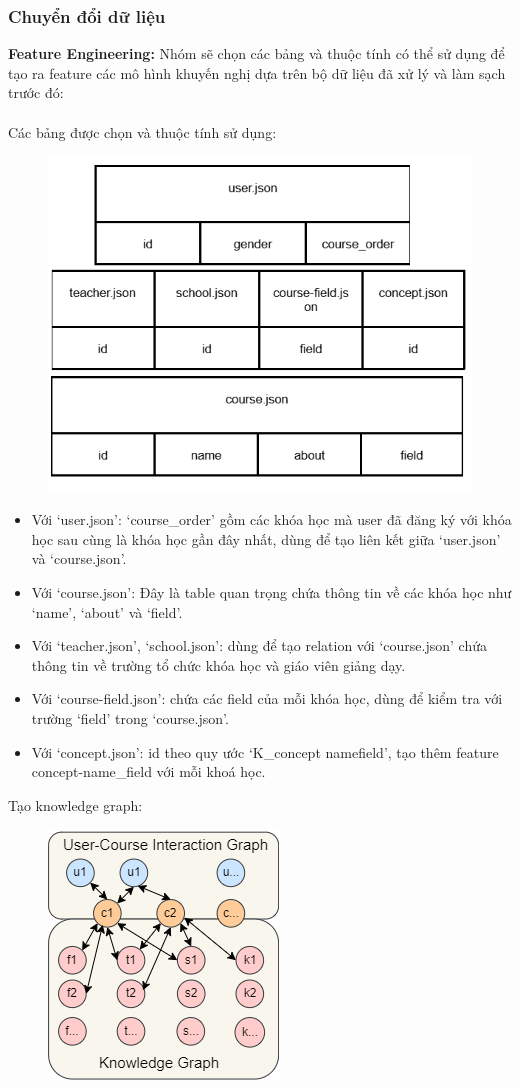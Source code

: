 \subsubsection{Chuyển đổi dữ liệu}
\textbf{Feature Engineering:}
Nhóm sẽ chọn các bảng và thuộc tính có thể sử dụng để tạo ra feature các mô hình khuyến nghị dựa trên bộ dữ liệu đã xử lý và làm sạch trước đó:\\
\\
Các bảng được chọn và thuộc tính sử dụng:
\begin{figure}[h]
    \centering
    \includegraphics[width=0.6\linewidth]{figures/53.png}
\end{figure}
\newpage
\begin{itemize}
    \item Với ‘user.json’: ‘course\_order’ gồm các khóa học mà user đã đăng ký với khóa học sau cùng là khóa học gần đây nhất, dùng để tạo liên kết giữa ‘user.json’ và ‘course.json’.
    \item Với ‘course.json’: Đây là table quan trọng chứa thông tin về các khóa học như ‘name’, ‘about’ và ‘field’.
    \item Với ‘teacher.json’, ‘school.json’: dùng để tạo relation với ‘course.json’ chứa thông tin về trường tổ chức khóa học và giáo viên giảng dạy.
    \item Với ‘course-field.json’: chứa các field của mỗi khóa học, dùng để kiểm tra với trường ‘field’ trong ‘course.json’.
    \item Với ‘concept.json’: id theo quy ước ‘K\_{concept name}{field}’, tạo thêm feature concept-name\_field với mỗi khoá học.
\end{itemize}
Tạo knowledge graph:
\begin{figure}[h]
    \centering
    \includegraphics[width=0.3\linewidth]{figures/54.png}
\end{figure}\\
